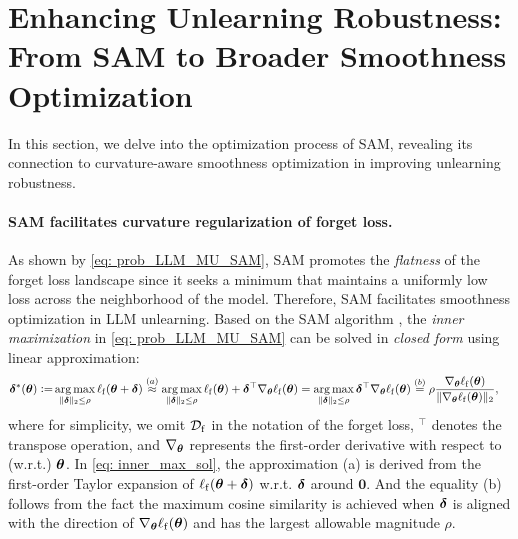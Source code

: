 \section{Enhancing Unlearning Robustness: From SAM to Broader Smoothness Optimization}
\label{sec: method}


In this section, we delve into the optimization process of SAM, revealing its connection to curvature-aware smoothness optimization in improving unlearning robustness. 





\paragraph{SAM facilitates curvature regularization of forget loss.}
As shown by \eqref{eq: prob_LLM_MU_SAM}, SAM promotes the \textit{flatness} of the forget loss landscape since it seeks a minimum that maintains a uniformly low loss across the neighborhood of the model. Therefore, SAM facilitates smoothness optimization in LLM unlearning. 
%
%
Based on the SAM algorithm \citep{foret2021sharpnessaware}, the \textit{inner maximization} in \eqref{eq: prob_LLM_MU_SAM} can be solved in \textit{closed form} using linear approximation:
\begin{align}
    \bdelta^*(\btheta) \Def & \displaystyle \argmax_{\| \bdelta \|_2 \leq \rho} \ell_{\mathrm{f}} (\btheta + \bdelta) \overset{(a)}{\approx} \displaystyle \argmax_{\| \bdelta \|_2 \leq \rho} \ell_{\mathrm{f}} (\btheta ) + \bdelta^\top \nabla_{\btheta} \ell_{\mathrm{f}} (\btheta ) 
  =  %
  \displaystyle \argmax_{\| \bdelta \|_2 \leq \rho}   \bdelta^\top \nabla_{\btheta} \ell_{\mathrm{f}} (\btheta ) \overset{(b)}{=} \rho \frac{\nabla_{\btheta} \ell_{\mathrm{f}} (\btheta )}{ \| \nabla_{\btheta} \ell_{\mathrm{f}} (\btheta ) \|_2},
  \label{eq: inner_max_sol}
\end{align}
where for simplicity, 
we omit $\mathcal{D_{\mathrm{f}}}$ in the notation of the forget loss, $^\top$ denotes the transpose operation, and $\nabla_{{\boldsymbol{\theta}}}$ represents the first-order derivative with respect to (w.r.t.) ${\boldsymbol{\theta}}$. In \eqref{eq: inner_max_sol}, the approximation (a) is derived from the first-order Taylor expansion of $\ell_{\mathrm{f}} ({\boldsymbol{\theta}} + \boldsymbol\delta)$ w.r.t. $\boldsymbol\delta$ around $\mathbf{0}$. And the equality (b) follows from the fact the maximum cosine similarity is achieved when $\boldsymbol\delta$ is aligned with the direction of  $\nabla_{{\boldsymbol{\theta}}} \ell_{\mathrm{f}} ({\boldsymbol{\theta}})$ and has the largest allowable magnitude $\rho$. 

